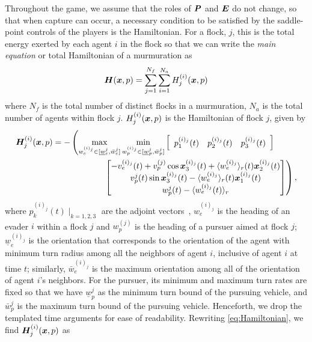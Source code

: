 Throughout the game, we assume that the roles of $\bm{P}$  and $\bm{E}$ do not change, so that when capture can occur, a necessary condition to be satisfied by the saddle-point controls of the players is the Hamiltonian. For  a flock, $j$, this is the total energy exerted by each agent $i$ in the flock so that we can write the \textit{main equation} or total Hamiltonian of a murmuration as 
%
\begin{align}
\bm{H}(\bm{x}, p) = \sum_{j=1}^{N_f} \sum_{i=1}^{N_a} H^{(i)}_j(\bm{x}, p)
\label{eq:HamiltonianOverall}
\end{align}
%
where $N_f$ is the total number of distinct flocks in a murmuration, $N_a$ is the total number of agents within flock $j$. $H^{(i)}_j(\bm{x}, p)$ is the Hamiltonian of flock $j$,  given by
%
\begin{align}
\hamfunc^{(i)}_j(\state, p)&= - \left(\max_{w_e^{(i)_j} \in [\underline{w}_e^j, \bar{w}_e^j]}  \min_{w_p^{(i)_j}  \in [\underline{w}_p^{j}, \bar{w}_p^j]}  \left[\begin{array}{ccc} p_1^{(i)_j}(t) & p_2^{(i)_j}(t) & p_3^{(i)_j}(t) \end{array}\right] \right. \nonumber \\ 
%
& \qquad\qquad\qquad \left. 
\begin{bmatrix}
-v_e^{(i)_j}(t) + v_p^{(j)} \cos \state_3^{(i)_j}(t) + \langle w_e^{(i)_j} \rangle_r (t) \state_2^{(i)_j}(t)
\\ 
v_p^{j}(t)\sin \state_3^{(i)_j}(t) -\langle w_e^{(i)_j} \rangle_r (t) \state_1^{(i)_j}(t)
\\ 
w_p^j(t) - \langle w_e^{(i)_j}(t) \rangle_r
\end{bmatrix}\right),
\label{eq:Hamiltonian}
\end{align}
%
where $p_k^{(i)_j}(t)\mid_{k=1,2,3}$ are the adjoint vectors~\cite{Merz1972}, $w_e^{(i)_j}$ is the heading of an evader $i$ within a flock $j$ and $w_p^{(j)}$ is the heading of a pursuer aimed at flock $j$; $\underline{w}_e^{(i)_j}$ is the orientation that corresponds to  the orientation of the agent with minimum turn radius among all the neighbors of agent $i$, inclusive of agent $i$ at time $t$; similarly, $\bar{w}_e^{(i)_j}$ is  the maximum orientation among all of the orientation of agent $i$'s neighbors. For the pursuer, its minimum and maximum turn rates are fixed so that we have $\underline{w}_p^{j}$ as the minimum turn bound of the pursuing vehicle, and $\bar{w}_p^j$ is the maximum turn bound of the pursuing vehicle. Henceforth, we drop the templated time arguments for ease of readability. Rewriting \eqref{eq:Hamiltonian}, we find $\bm{H}^{(i)}_j(\bm{x}, p)$ as
